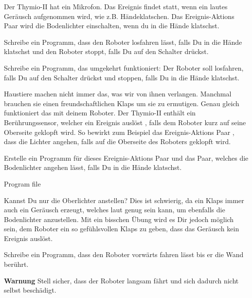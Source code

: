 
Der Thymio-II hat ein Mikrofon.
Das Ereignis  findet statt,
wenn ein lautes Geräusch aufgenommen wird, wie z.B. Händeklatschen.
Das Ereignis-Aktions Paar  wird die Bodenlichter einschalten,
wenn du in die Hände klatschst.



Schreibe ein Programm,
dass den Roboter losfahren lässt,
falls Du in die Hände klatschst und den Roboter stoppt,
falls Du auf den Schalter drückst.

Schreibe ein Programm, das umgekehrt funktioniert:
Der Roboter soll losfahren,
falls Du auf den Schalter drückst und stoppen,
falls Du in die Hände klatschst.


Haustiere machen nicht immer das,
was wir von ihnen verlangen.
Manchmal brauchen sie einen freundschaftlichen Klaps um sie zu ermutigen.
Genau gleich funktioniert das mit deinem Roboter.
Der Thymio-II enthält ein Berührungssensor, welcher ein Ereignis auslöst , falls dem Roboter kurz auf seine Oberseite geklopft wird. So bewirkt zum Beispiel das Ereignis-Aktions Paar , dass die Lichter angehen, falls auf die Oberseite des Roboters geklopft wird.

Erstelle ein Programm für dieses Ereignis-Aktions Paar
und das Paar, welches die Bodenlichter angehen lässt,
falls Du in die Hände klatschst.

{\raggedleft \hfill Program file }

Kannst Du nur die Oberlichter anstellen?
Dies ist schwierig, da ein Klaps immer auch ein Geräusch erzeugt,
welches laut genug sein kann, um ebenfalls die Bodenlichter anzustellen.
Mit ein bisschen Übung wird es Dir jedoch möglich sein,
dem Roboter ein so gefühlsvollen Klaps zu geben,
dass das Geräusch kein Ereignis auslöst.


Schreibe ein Programm, dass den Roboter vorwärts fahren lässt bis er die Wand berührt. 

\textbf{Warnung} Stell sicher, dass der Roboter langsam fährt und sich dadurch nicht selbst beschädigt.
